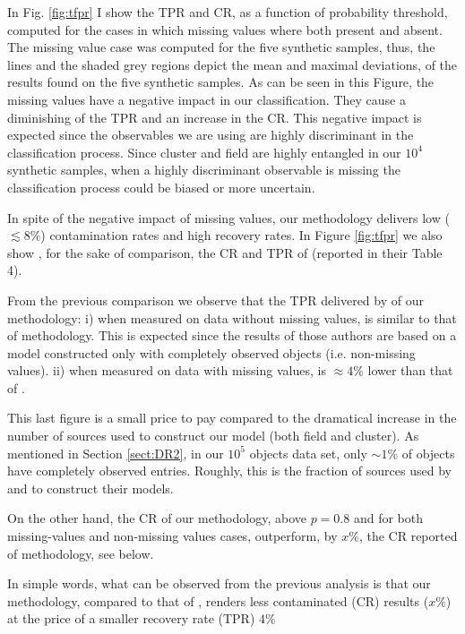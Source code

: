 In Fig. \ref{fig:tfpr} I show the TPR and CR, as a function of probability threshold, computed for the cases in which missing values where both present and absent. The missing value case was computed for the five synthetic samples, thus, the lines and the shaded grey regions depict the mean and maximal deviations, of the results found on the five synthetic samples. As can be seen in this Figure, the missing values have a negative impact in our classification. They cause a diminishing of the TPR  and an increase in the CR. This negative impact is expected since the observables we are using are highly discriminant in the classification process. Since cluster and field are highly entangled in our $10^4$ synthetic samples, when a highly discriminant observable is missing the classification process could be biased or more uncertain.

In spite of the negative impact of missing values, our methodology delivers low ($\lesssim 8\%$) contamination rates and high recovery rates. In Figure \ref{fig:tfpr} we also show , for the sake of comparison, the CR and TPR of \citet{Sarro2014} (reported in their Table 4). 

From the previous comparison we observe that the TPR delivered by of our methodology: i) when measured on data without missing values, is similar to that of \citet{Sarro2014} methodology. This is expected since the results of those authors are based on a model constructed only with completely observed objects (i.e. non-missing values). ii) when measured on data with missing values, is $\approx 4\%$ lower than that of \citet{Sarro2014}. 

This last figure is a small price to pay compared to the dramatical increase in the number of sources used to construct our model (both field and cluster). As mentioned in Section \ref{sect:DR2}, in our $10^5$ objects data set, only $\sim 1\%$ of objects have completely observed entries. Roughly, this is the fraction of sources used by \citet{Sarro2014} and \citet{Bouy2015} to construct their models. 

On the other hand, the CR of our methodology, above $p=0.8$ and for both missing-values and non-missing values cases, outperform, by $x\%$, the CR reported of \citet{Sarro2014} methodology, see below.

In simple words, what can be observed from the previous analysis is that our methodology, compared to that of \citet{Sarro2014}, renders less contaminated (CR) results ($x\%$) at the price of a smaller recovery rate (TPR) $4\%$

